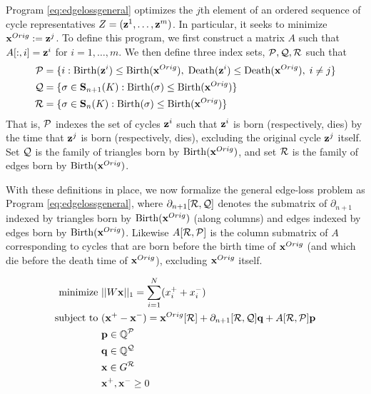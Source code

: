 Program \eqref{eq:edgelossgeneral} optimizes the $j$th element of an ordered sequence of cycle representatives $Z = (\mathbf{z}^1, \ldots, \mathbf{z}^m)$.  In particular, it seeks to minimize $\mathbf{x}^{Orig} := {\mathbf z}^j$.  To define this program, we first construct a matrix $A$ such that $A[:, i] = {\mathbf z}^i$ for $i = 1, \ldots, m$.  We then define  three index sets, $\mathcal P, \mathcal Q, \mathcal R$ such that 
    \begin{align*}
        \mathcal P &= \{ i :  \mathrm{Birth}({\mathbf z}^i) \le \mathrm{Birth}(\mathbf{x}^{Orig}), \;  \mathrm{Death}({\mathbf z}^i) \le \mathrm{Death}(\mathbf{x}^{Orig}), \; i \neq j \} \\
        \mathcal Q &= \{\sigma \in \mathbf{S}_{n+1}(K) : \mathrm{Birth}(\sigma) \le \mathrm{Birth}(\mathbf{x}^{Orig})\} 
        \\
        \mathcal R &= \{\sigma \in \mathbf{S}_n(K) : \mathrm{Birth}(\sigma) \le \mathrm{Birth}(\mathbf{x}^{Orig})\}
    \end{align*} 
That is, $\mathcal P$ indexes the set of cycles ${\mathbf z}^i$ such that ${\mathbf z}^i$ is born  (respectively, dies) by the time that ${\mathbf z}^j$ is born (respectively, dies),  excluding the original cycle ${\mathbf z}^j$ itself. Set $\mathcal Q$ is the family of triangles born by $\mathrm{Birth}(\mathbf{x}^{Orig})$, and set $\mathcal R$ is the family of edges born by $\mathrm{Birth}(\mathbf{x}^{Orig})$. 

With these definitions in place, we now formalize the general edge-loss problem as Program \eqref{eq:edgelossgeneral}, where  $\partial_{n+1}[\mathcal R,\mathcal Q]$ denotes the  submatrix of $\partial_{n+1}$ indexed by triangles born by $\mathrm{Birth}(\mathbf{x}^{Orig})$ (along columns) and edges indexed by edges born by $\mathrm{Birth}(\mathbf{x}^{Orig})$.  Likewise $A[ \mathcal R ,\mathcal P]$ is the column submatrix of $A$ corresponding to cycles that are born  before the birth time of $\mathbf{x}^{Orig}$ (and which die before the death time of $\mathbf{x}^{Orig}$), excluding $\mathbf{x}^{Orig}$ itself.

 
\begin{align}
\begin{split}
    \text{minimize   } & ||W \mathbf{x} ||_1 = \sum_{i=1}^N  (x^+_i + x_i^-)\\
   \text{subject to  } &  
      (\mathbf{x}^+ - \mathbf{x}^- )= \mathbf{x}^{Orig}[\mathcal R] +   \partial_{n+1}[\mathcal R, \mathcal Q]  \mathbf{q} + A[\mathcal R, \mathcal P] \mathbf{p} \\
      & \mathbf{p} \in \mathbb{Q}^{\mathcal P} \\
      & \mathbf{q} \in \mathbb{Q}^{\mathcal Q} \\      
      & \mathbf{x} \in G^{\mathcal R } \\      
      & \mathbf{x}^+, \mathbf{x}^- \geq 0 
      \end{split}
      \label{eq:edgelossgeneral}
\end{align}




